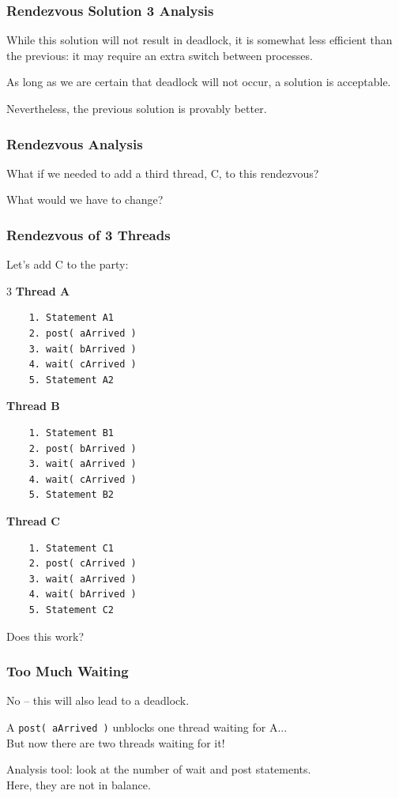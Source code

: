 \begin{frame}
	\frametitle{Rendezvous Solution 3 Analysis}

	While this solution will not result in deadlock, it is somewhat less efficient than the previous: it may require an extra switch between processes.

	As long as we are certain that deadlock will not occur, a solution is acceptable.

	Nevertheless, the previous solution is provably better.

\end{frame}


\begin{frame}
	\frametitle{Rendezvous Analysis}

	What if we needed to add a third thread, C, to this rendezvous?

	What would we have to change?


\end{frame}

\begin{frame}[fragile]
	\frametitle{Rendezvous of 3 Threads}

	Let's add C to the party:

	\begin{multicols}{3}
		\textbf{Thread A}
		\begin{verbatim}
	1. Statement A1
	2. post( aArrived )
	3. wait( bArrived )
	4. wait( cArrived )
	5. Statement A2
  		\end{verbatim}
		\columnbreak
		\textbf{Thread B}
		\begin{verbatim}
	1. Statement B1
	2. post( bArrived )
	3. wait( aArrived )
	4. wait( cArrived )
	5. Statement B2
  		\end{verbatim}
  		\columnbreak
		\textbf{Thread C}\vspace{-2em}
		\begin{verbatim}
	1. Statement C1
	2. post( cArrived )
	3. wait( aArrived )
	4. wait( bArrived )
	5. Statement C2
  		\end{verbatim}
	\end{multicols}
	\vspace{-2em}

Does this work?

\end{frame}


\begin{frame}
\frametitle{Too Much Waiting}

No -- this will also lead to a deadlock.

A \texttt{post( aArrived )} unblocks one thread waiting for A...\\
\quad But now there are two threads waiting for it!


Analysis tool: look at the number of wait and post statements.\\
\quad Here, they are not in balance.

\end{frame}

